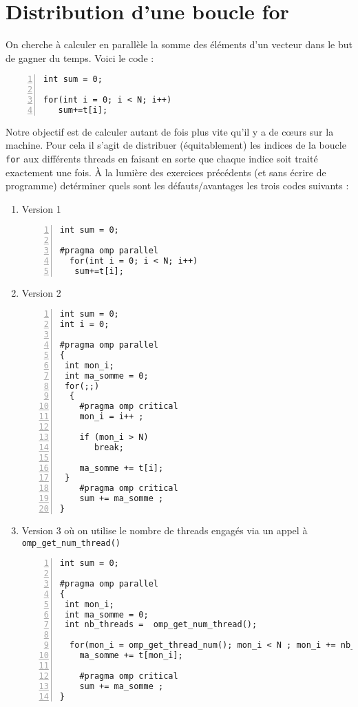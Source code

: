 \documentclass[A4wide]{article}
\begin{document}
\section{Distribution d'une boucle for}

On cherche à calculer en parallèle la somme des éléments d'un vecteur
dans le but de gagner du temps. Voici le code :

\begin{lstlisting}[numbers=left, numberstyle=\tiny, stepnumber=1,  numbersep=5pt]
int sum = 0;

for(int i = 0; i < N; i++)
   sum+=t[i];
\end{lstlisting}


Notre objectif est de calculer autant de fois plus vite qu'il y a de
cœurs sur la machine. Pour cela il s'agit de distribuer (équitablement) les indices de la
boucle \verb#for# aux différents threads en faisant en sorte que
chaque indice soit traité exactement une fois. 
À la lumière des exercices précédents (et sans écrire de
programme) detérminer  quels sont les défauts/avantages les
trois codes suivants :
\newpage 
\begin{enumerate}
\item Version 1
\begin{lstlisting}[numbers=left, numberstyle=\tiny, stepnumber=1,  numbersep=5pt]
int sum = 0;

#pragma omp parallel 
  for(int i = 0; i < N; i++) 
   sum+=t[i];
\end{lstlisting}

\item Version 2
\begin{lstlisting}[numbers=left, numberstyle=\tiny, stepnumber=1,  numbersep=5pt]
int sum = 0;
int i = 0;

#pragma omp parallel 
{
 int mon_i;
 int ma_somme = 0; 
 for(;;)
  {
    #pragma omp critical
    mon_i = i++ ;
 
    if (mon_i > N)
       break;
    
    ma_somme += t[i];
 }
    #pragma omp critical
    sum += ma_somme ;
}
\end{lstlisting}

\item Version 3 où on utilise le nombre de threads engagés via un appel à \verb#omp_get_num_thread()# 
\begin{lstlisting}[numbers=left, numberstyle=\tiny, stepnumber=1,  numbersep=5pt]
int sum = 0;

#pragma omp parallel 
{
 int mon_i;
 int ma_somme = 0; 
 int nb_threads =  omp_get_num_thread();

  for(mon_i = omp_get_thread_num(); mon_i < N ; mon_i += nb_threads)
    ma_somme += t[mon_i];

    #pragma omp critical
    sum += ma_somme ;
}
\end{lstlisting}
\end{enumerate}
\end{document}
